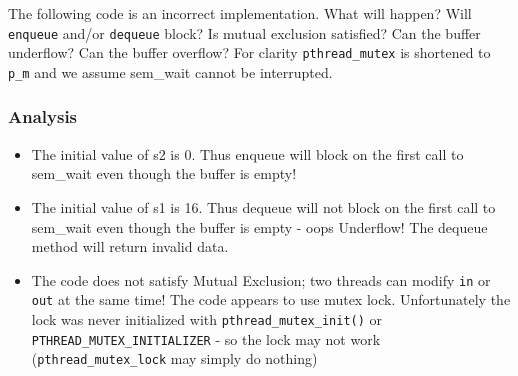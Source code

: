 The following code is an incorrect implementation. What will happen?
Will \texttt{enqueue} and/or \texttt{dequeue} block? Is mutual exclusion
satisfied? Can the buffer underflow? Can the buffer overflow? For
clarity \texttt{pthread\_mutex} is shortened to \texttt{p\_m} and we
assume sem\_wait cannot be interrupted.

\begin{Shaded}
\begin{Highlighting}[]
 \NormalTok{*b[}\NormalTok{]}
 
 
    \NormalTok{,}\NormalTok{)}
    \NormalTok{,}\NormalTok{)}
\NormalTok{\}}

 


 \NormalTok{b[ (in++) & (N}\NormalTok{) ] = value}

\NormalTok{\}}

 
   \NormalTok{*result = b[(out++) & }\NormalTok{]}

   
\NormalTok{\}}
\end{Highlighting}
\end{Shaded}

\subsubsection{Analysis}\label{analysis-1}

\begin{itemize}
\tightlist
\item
  The initial value of s2 is 0. Thus enqueue will block on the first
  call to sem\_wait even though the buffer is empty!
\item
  The initial value of s1 is 16. Thus dequeue will not block on the
  first call to sem\_wait even though the buffer is empty - oops
  Underflow! The dequeue method will return invalid data.
\item
  The code does not satisfy Mutual Exclusion; two threads can modify
  \texttt{in} or \texttt{out} at the same time! The code appears to use
  mutex lock. Unfortunately the lock was never initialized with
  \texttt{pthread\_mutex\_init()} or
  \texttt{PTHREAD\_MUTEX\_INITIALIZER} - so the lock may not work
  (\texttt{pthread\_mutex\_lock} may simply do nothing)
\end{itemize}

